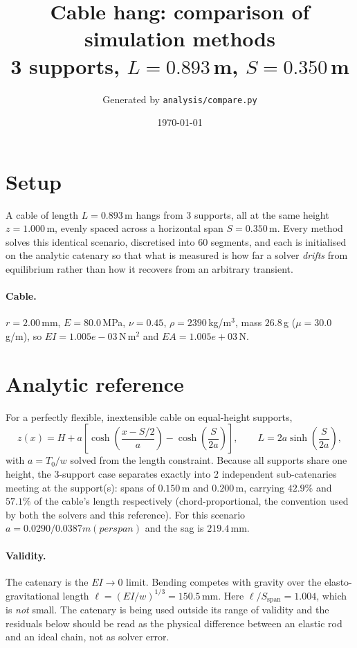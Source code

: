 \documentclass[11pt,a4paper]{article}
\title{Cable hang: comparison of simulation methods\\
\large 3 supports, $L = 0.893$\,m,
$S = 0.350$\,m}
\author{Generated by \texttt{analysis/compare.py}}
\date{\today}
\begin{document}
\maketitle

\section{Setup}

A cable of length $L = 0.893$\,m hangs from
3 supports, all at the same height
$z = 1.000$\,m, evenly spaced across a horizontal span
$S = 0.350$\,m. Every method solves this identical scenario,
discretised into 60 segments, and each is initialised on
the analytic catenary so that what is measured is how far a solver
\emph{drifts} from equilibrium rather than how it recovers from an arbitrary
transient.

\paragraph{Cable.} $r = 2.00$\,mm,
$E = 80.0$\,MPa, $\nu = 0.45$,
$\rho = 2390$\,kg/m$^3$, mass $26.8$\,g
($\mu = 30.0$\,g/m), so
$EI = 1.005e-03$\,N\,m$^2$ and
$EA = 1.005e+03$\,N.

\section{Analytic reference}

For a perfectly flexible, inextensible cable on equal-height supports,
\begin{equation}
  z(x) = H + a\left[\cosh\!\left(\frac{x - S/2}{a}\right)
                    - \cosh\!\left(\frac{S}{2a}\right)\right],
  \qquad L = 2a\sinh\!\left(\frac{S}{2a}\right),
\end{equation}
with $a = T_0/w$ solved from the length constraint. Because all supports share
one height, the 3-support case separates exactly into
2 independent sub-catenaries meeting at the support(s):
spans of $0.150$\,m and $0.200$\,m, carrying $42.9\%$ and $57.1\%$ of the cable's length respectively (chord-proportional, the convention used by both the solvers and this reference).
For this scenario $a = 0.0290 / 0.0387 m (per span)$ and the sag is
$219.4$\,mm.

\paragraph{Validity.} The catenary is the $EI \to 0$ limit. Bending competes
with gravity over the elasto-gravitational length
$\ell = (EI/w)^{1/3} = 150.5$\,mm. Here $\ell/S_{\mathrm{span}} = 1.004$, which is \emph{not} small. The catenary is being used outside its range of validity and the residuals below should be read as the physical difference between an elastic rod and an ideal chain, not as solver error.
\end{document}
